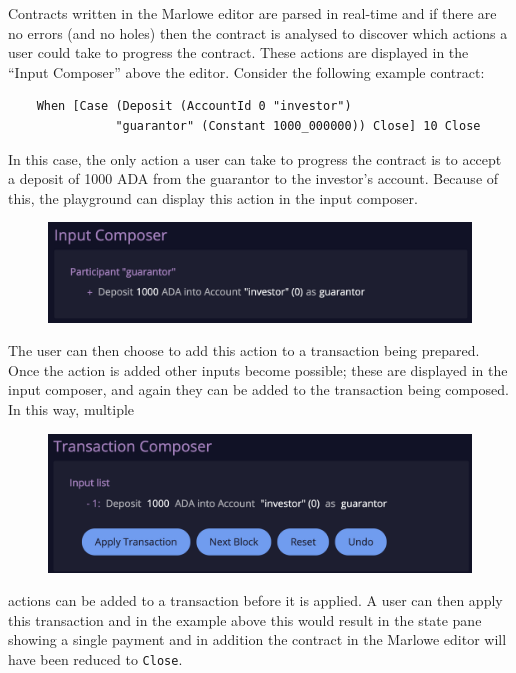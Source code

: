 \documentclass[runningheads]{llncs}
\renewcommand{\lstinline}[1]{\texttt{#1}}
\begin{document}
Contracts written in the Marlowe editor are parsed in real-time and if there are no errors (and no holes) then the contract is analysed to discover which actions a user could take to progress the contract. These actions are displayed in the ``Input Composer'' above the editor. Consider the following example contract:
\begin{verbatim}
    When [Case (Deposit (AccountId 0 "investor") 
               "guarantor" (Constant 1000_000000)) Close] 10 Close
\end{verbatim}
In this case, the only action a user can take to progress the contract is to accept a deposit of 1000 ADA
from the guarantor to the investor's account. Because of this, the playground can display this action in the input composer.

\begin{figure}
    \vspace*{-0.2in}
    \includegraphics[scale=0.15]{input_composer.png}
\end{figure}

\noindent
The user can then choose to add this action to a transaction being prepared. Once the action is added other inputs become possible; these are displayed in the input composer, and again they can be added to the transaction being composed. In this way, multiple %

\begin{figure}
    \vspace*{-0.2in}
    \includegraphics[scale=0.15]{tx_composer.png}
\end{figure}

\noindent
actions can be added to a transaction before it is applied.
A user can then apply this transaction and in the example above this would result in the state pane showing a single payment and in addition the contract in the Marlowe editor will have been reduced to \lstinline{Close}.
\end{document}
